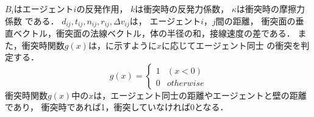 $B_i$はエージェント$i$の反発作用，
$k$は衝突時の反発力係数，
$\kappa$は衝突時の摩擦力係数
である．
$d_{ij}, t_{ij}, n_{ij}, r_{ij}, \Delta v_{ij}$は，
エージェント$i$，$j$間の距離，
衝突面の垂直ベクトル，衝突面の法線ベクトル，体の半径の和，接線速度の差である．
また，衝突時関数$g(x)$は，に示すように$x$に応じてエージェント同士
の衝突を判定する．
%
\begin{equation}
  \label{eq:gx_siki}
  g(x) =
  \begin{cases}
    1 & (x<0)     \\
    0 & otherwise
  \end{cases}
\end{equation}
%
衝突時関数$g(x)$中の$x$は，エージェント同士の距離やエージェントと壁の距離であり，
衝突時であれば1，衝突していなければ0となる．
\fi



%

